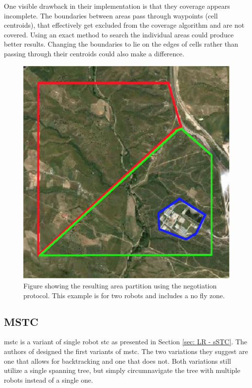 One visible drawback in their implementation is that they coverage appears incomplete. The boundaries between areas pass through waypoints (cell centroids), that effectively get excluded from the coverage algorithm and are not covered. Using an exact method to search the individual areas could produce better results. Changing the boundaries to lie on the edges of cells rather than passing through their centroids could also make a difference.
\begin{figure}[h!]
\centering
\includegraphics[scale=0.35]{figs/Negotiation_Protocol}
\caption{Figure showing the resulting area partition using the negotiation protocol. This example is for two robots and includes a no fly zone. \cite{Rossi2009}}
\label{fig:NegProt}
\end{figure}
\subsection{MSTC}
\label{sec:LR-MSTC}
\ac{mstc} is a variant of single robot \ac{stc} as presented in Section \ref{sec: LR - sSTC}. The authors of \cite{Hazon2005} designed the first variants of \ac{mstc}. The two variations they suggest are one that allows for backtracking and one that does not. Both variations still utilize a single spanning tree, but simply circumnavigate the tree with multiple robots instead of a single one.

